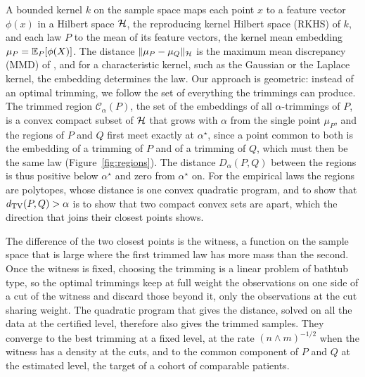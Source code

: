 A bounded kernel $k$ on the sample space maps each point $x$ to a feature vector $\phi(x)$ in a Hilbert space $\mathcal{H}$,
the reproducing kernel Hilbert space (RKHS) of $k$, and each law $P$ to the mean of its feature vectors, the kernel
mean embedding $\mu_P=\mathbb{E}_P[\phi(X)]$. The distance $\|\mu_P-\mu_Q\|_{\mathcal{H}}$ is the maximum mean discrepancy (MMD) of
\citet{gretton2012kernel}, and for a characteristic kernel, such as the Gaussian or the Laplace kernel, the embedding
determines the law. Our approach is geometric: instead of an optimal trimming, we follow the set of everything the
trimmings can produce. The trimmed region $\mathcal C_\alpha(P)$, the set of the embeddings of all $\alpha$-trimmings
of $P$, is a convex compact subset of $\mathcal{H}$ that grows with $\alpha$ from the single point $\mu_P$, and the regions of
$P$ and $Q$ first meet exactly at $\alpha^\star$, since a point common to both is the embedding of a trimming of $P$
and of a trimming of $Q$, which must then be the same law (Figure~\ref{fig:regions}). The distance $D_\alpha(P,Q)$
between the regions is thus positive below $\alpha^\star$ and zero from $\alpha^\star$ on. For the empirical laws the
regions are polytopes, whose distance is one convex quadratic program, and to show that $d_{\mathrm{TV}}(P,Q)>\alpha$ is to show
that two compact convex sets are apart, which the direction that joins their closest points shows.

The difference of the two closest points is the witness, a function on the sample space that is large where the first
trimmed law has more mass than the second. Once the witness is fixed, choosing the trimming is a linear problem of
bathtub type, so the optimal trimmings keep at full weight the observations on one side of a cut of the witness and
discard those beyond it, only the observations at the cut sharing weight. The quadratic program that gives the
distance, solved on all the data at the certified level, therefore also gives the trimmed samples. They converge to
the best trimming at a fixed level, at the rate $(n\wedge m)^{-1/2}$ when the witness has a density at the cuts, and to
the common component of $P$ and $Q$ at the estimated level, the target of a cohort of comparable patients.

